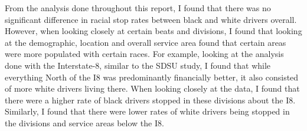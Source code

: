 \documentclass[11pt]{article}
\begin{document}
    From the analysis done throughout this report, I found that there was no
significant difference in racial stop rates between black and white
drivers overall. However, when looking closely at certain beats and
divisions, I found that looking at the demographic, location and overall
service area found that certain areas were more populated with certain
races. For example, looking at the analysis done with the Interstate-8,
similar to the SDSU study, I found that while everything North of the I8
was predominantly financially better, it also consisted of more white
drivers living there. When looking closely at the data, I found that
there were a higher rate of black drivers stopped in these divisions
about the I8. Similarly, I found that there were lower rates of white
drivers being stopped in the divisions and service areas below the I8.


    
    
    
    
\end{document}
